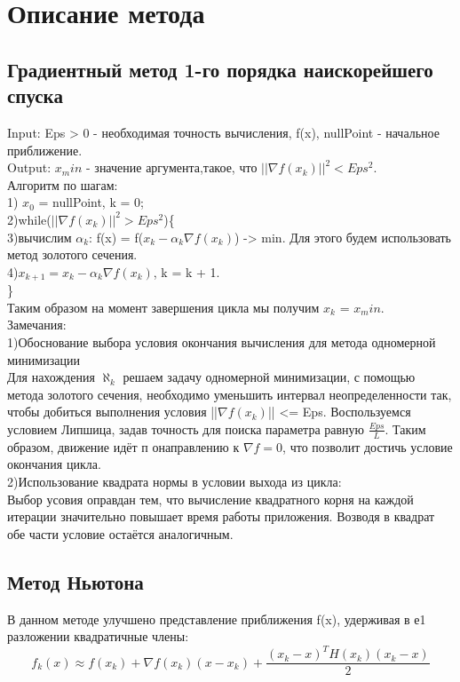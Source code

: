 \documentclass[a4]{article}
\begin{document}
	\section{Описание метода}
		\subsection{Градиентный метод 1-го порядка наискорейшего спуска}
			Input: Eps > 0 - необходимая точность вычисления, f(x), nullPoint - начальное приближение.\\
			
			Output: $x_min$ - значение аргумента,такое, что $||\nabla f(x_k)||^2 < Eps^2$.\\
			
			Алгоритм по шагам:\\
			1) $x_0$ = nullPoint, k = 0;\\
			2)while($||\nabla f(x_k)||^2 > Eps^2$)\{\\
			
				3)вычислим $\alpha_k$: f(x) = f($x_k - \alpha_k \nabla f(x_k)$) -> min. Для этого будем использовать метод золотого сечения.\\
				
				4)$x_{k + 1} = x_k - \alpha_k \nabla f(x_k)$, k = k + 1.\\
				\}\\
			
			Таким образом на момент завершения цикла мы получим $x_k$ = $x_min$.\\
			
			Замечания:\\
			1)Обоснование выбора условия окончания вычисления для метода одномерной минимизации\\
				Для нахождения $\aleph_k$ решаем задачу одномерной минимизации, с помощью метода золотого сечения, необходимо уменьшить интервал неопределенности так, чтобы добиться выполнения условия ||$\nabla f(x_k)$|| <= Eps.
				Воспользуемся условием Липшица, задав точность для поиска параметра равную $\frac{Eps}{L}$. Таким образом, движение идёт п онаправлению к $\nabla f = 0$, что позволит достичь условие окончания цикла.\\
			2)Использование квадрата нормы в условии выхода из цикла:\\
			Выбор усовия оправдан тем, что вычисление квадратного корня на каждой итерации значительно повышает время работы приложения. Возводя в квадрат обе части условие остаётся аналогичным.
			
			\subsection{Метод Ньютона}
				В данном методе улучшено представление приближения f(x), удерживая в е1 разложении квадратичные члены:
				$$f_k(x) \approx f(x_k) + \nabla f(x_k) (x - x_k) + \frac{(x_k - x)^T H(x_k) (x_k - x)}{2}$$
				
\end{document}
